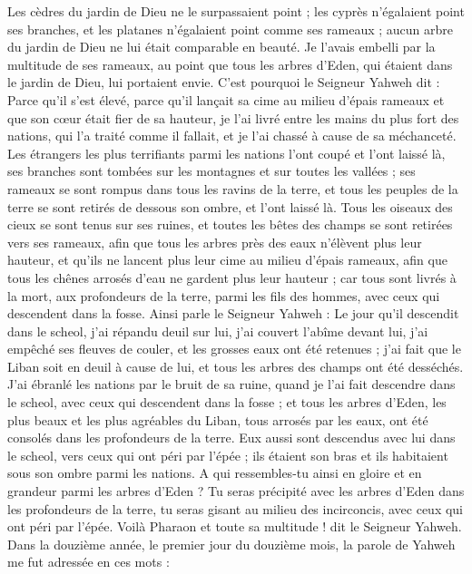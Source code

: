 \begin{multicols}{2}
Les cèdres du jardin de Dieu ne le surpassaient point ; les cyprès n’égalaient point ses branches, et les platanes n'égalaient point comme ses rameaux ; aucun arbre du jardin de Dieu ne lui était comparable en beauté.
Je l'avais embelli par la multitude de ses rameaux, au point que tous les arbres d'Eden, qui étaient dans le jardin de Dieu, lui portaient envie.
C'est pourquoi le Seigneur Yahweh dit : Parce qu’il s’est élevé, parce qu’il lançait sa cime au milieu d’épais rameaux et que son cœur était fier de sa hauteur,
je l'ai livré entre les mains du plus fort des nations, qui l'a traité comme il fallait, et je l'ai chassé à cause de sa méchanceté.
Les étrangers les plus terrifiants parmi les nations l'ont coupé et l'ont laissé là, ses branches sont tombées sur les montagnes et sur toutes les vallées ; ses rameaux se sont rompus dans tous les ravins de la terre, et tous les peuples de la terre se sont retirés de dessous son ombre, et l'ont laissé là.
Tous les oiseaux des cieux se sont tenus sur ses ruines, et toutes les bêtes des champs se sont retirées vers ses rameaux,
afin que tous les arbres près des eaux n’élèvent plus leur hauteur, et qu’ils ne lancent plus leur cime au milieu d'épais rameaux, afin que tous les chênes arrosés d’eau ne gardent plus leur hauteur ; car tous sont livrés à la mort, aux profondeurs de la terre, parmi les fils des hommes, avec ceux qui descendent dans la fosse.
Ainsi parle le Seigneur Yahweh : Le jour qu'il descendit dans le scheol, j’ai répandu deuil sur lui, j’ai couvert l'abîme devant lui, j'ai empêché ses fleuves de couler, et les grosses eaux ont été retenues ; j’ai fait que le Liban soit en deuil à cause de lui, et tous les arbres des champs ont été desséchés.
J'ai ébranlé les nations par le bruit de sa ruine, quand je l’ai fait descendre dans le scheol, avec ceux qui descendent dans la fosse\FTNT{} ; et tous les arbres d'Eden, les plus beaux et les plus agréables du Liban, tous arrosés par les eaux, ont été consolés dans les profondeurs de la terre.
Eux aussi sont descendus avec lui dans le scheol, vers ceux qui ont péri par l'épée ; ils étaient son bras et ils habitaient sous son ombre parmi les nations.
A qui ressembles-tu ainsi en gloire et en grandeur parmi les arbres d'Eden ? Tu seras précipité avec les arbres d'Eden dans les profondeurs de la terre, tu seras gisant au milieu des incirconcis, avec ceux qui ont péri par l'épée. Voilà Pharaon et toute sa multitude ! dit le Seigneur Yahweh.
\VerseOne{}Dans la douzième année, le premier jour du douzième mois, la parole de Yahweh me fut adressée en ces mots :

\end{multicols}
